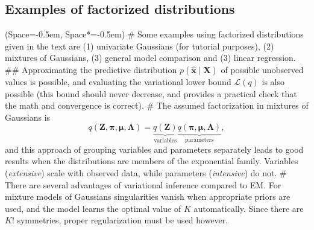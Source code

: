 \documentclass[12pt, a4paper]{article}
\newcommand{\listSpace}{-0.5em}%
\newcommand{\vect}[1]{\bm{#1}}
\begin{document}
\subsection*{Examples of factorized distributions}
\begin{easylist}[itemize]
	\ListProperties(Space=\listSpace, Space*=\listSpace)
	# Some examples using factorized distributions given in the text are (1) univariate Gaussians (for tutorial purposes), (2) mixtures of Gaussians, (3) general model comparison and (3) linear regression.
	## Approximating the predictive distribution $p(\widehat{\vect{x}} \mid \vect{X})$ of possible unobserved values is possible, and evaluating the variational lower bound $\mathcal{L}(q)$ is also possible (this bound should never decrease, and provides a practical check that the math and convergence is correct).
	# The assumed factorization in mixtures of Gaussians is
	\begin{equation*}
		q(\vect{Z}, \vect{\pi}, \vect{\mu}, \vect{\Lambda})
		=
		\underbrace{q(\vect{Z})}_{\text{variables}}
		\underbrace{q(\vect{\pi}, \vect{\mu}, \vect{\Lambda})}_{\text{parameters}},
	\end{equation*}
	and this approach of grouping variables and parameters separately leads to good results when the distributions are members of the exponential family.
	Variables (\emph{extensive}) scale with observed data, while parameters (\emph{intensive}) do not.
	# There are several advantages of variational inference compared to EM.
	For mixture models of Gaussians singularities vanish when appropriate priors are used, and the model learns the optimal value of $K$ automatically.
	Since there are $K!$ symmetries, proper regularization must be used however.
\end{easylist}
\end{document}
